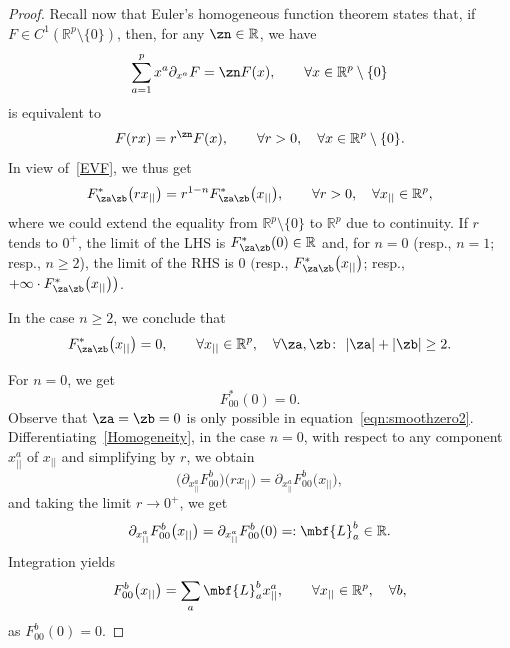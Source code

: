 \documentclass[10pt,a4paper]{amsart}
\newcommand{\R}{{\mathbb R}}
\newcommand{\0}{\otimes}
\numberwithin{equation}{section}
\begin{document}
\begin{proof}
Recall now that Euler's homogeneous function theorem states that, if $F\in C^1(\R^p\setminus\{0\})$, then, for any $\zn\in\R$, we have
\[
\sum_{a=1}^{p}x^a\partial_{x^a}F=\zn F(x),\qquad\forall x\in\R^p\setminus\{0\}
\]
is equivalent to
\[
F(r x)=r^\zn F(x),\qquad\forall r>0,\quad\forall x\in\R^p\setminus\{0\}.
\]
In view of~\eqref{EVF}, we thus get
\begin{gather}\label{Homogeneity}
F_{\za\zb}^\ast\big(rx_{||}\big)=r^{1-n}F_{\za\zb}^\ast\big(x_{||}\big),\qquad
\forall r>0,\quad \forall x_{||}\in\R^p,
\end{gather}
 where we could extend the equality from $\R^p\setminus\{0\}$ to $\R^p$ due to continuity. If $r$ tends to $0^+$, the limit of the {\small LHS} is $F_{\za\zb}^\ast(0)\in\R$ and, for $n=0$ (resp., $n=1$; resp., $n\ge 2$), the limit of the {\small RHS} is $0$ $\big($resp., $F_{\za\zb}^\ast\big(x_{||}\big)$; resp., $+\infty\cdot F_{\za\zb}^\ast\big(x_{||}\big)\big)$.

In the case $n\ge 2$, we conclude that
\begin{gather}\label{LinForm1}
F_{\za\zb}^*\big(x_{||}\big)=0,\qquad
\forall x_{||}\in\R^p,\quad \forall \za,\zb\colon\ |\za|+|\zb|\ge 2.
\end{gather}

For $n=0$, we get
\[
F^*_{00}(0)=0.
\]
Observe that $\za=\zb=0$ is only possible in equation~\eqref{eqn:smoothzero2}. Differentiating~\eqref{Homogeneity}, in the case $n=0$, with respect to any component $x_{||}^a$ of $x_{||}$ and simplifying by $r$, we obtain
\[
\big(\partial_{x^a_{||}}F_{00}^b\big)\big(rx_{||}\big)=\partial_{x_{||}^a}F^b_{00}\big(x_{||}\big),
\]
and taking the limit $r\to 0^+$, we get
\[
\partial_{x_{||}^a}F^b_{00}\big(x_{||}\big)=\partial_{x_{||}^a}F^b_{00}(0)=:\mbf{L}^b_a\in\R.
\]
Integration yields
\begin{gather}\label{LinForm2}
F^b_{00}\big(x_{||}\big)=\sum_a \mbf{L}^b_a x_{||}^a,\qquad
\forall x_{||}\in\R^p,\quad \forall b,
\end{gather}
as $F_{00}^b(0)=0$.


\end{proof}
\end{document}
